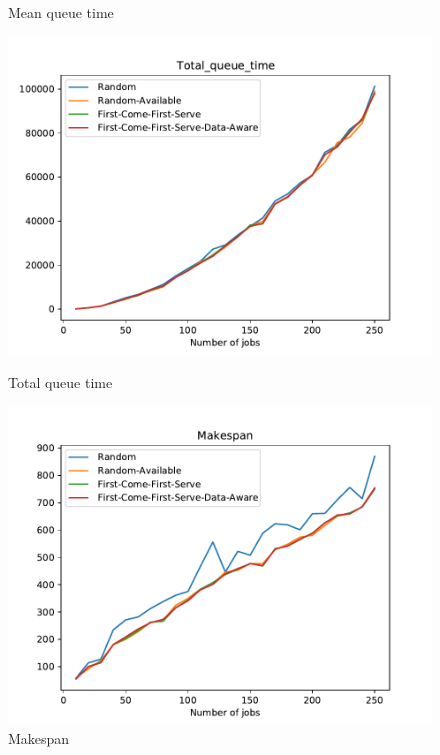 \documentclass[a4paper]{article}
\begin{document}
\begin{figure}[ht]
\begin{minipage}[b]{0.5\linewidth}
    \caption{Mean queue time} 
    \vspace{4ex}
  \end{minipage} 
  \begin{minipage}[b]{0.5\linewidth}
    \centering
    \includegraphics[width=1.11\linewidth]{MBSS/plot/Total_queue_time.pdf} 
    \caption{Total queue time} 
    \vspace{4ex}
  \end{minipage}%
  \begin{minipage}[b]{0.5\linewidth}
    \centering
    \includegraphics[width=1.11\linewidth]{MBSS/plot/Makespan.pdf} 
    \caption{Makespan} 
    \vspace{4ex}
  \end{minipage} 
\end{figure}
\end{document}
